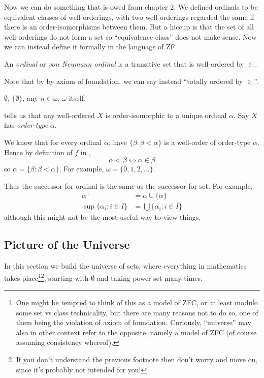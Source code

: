 \documentclass[a4paper]{article}
\begin{document}
Now we can do something that is owed from chapter 2. We defined ordinals to be equivalent classes of well-orderings, with two well-orderings regarded the same if there is an order-isomorphisms between them. But a hiccup is that the set of all well-orderings do not form a set so ``equivalence class'' does not make sense. Now we can instead define it formally in the language of ZF.

\begin{definition}
  An \emph{ordinal} or \emph{von Neumann ordinal} is a transitive set that is well-ordered by \(\in\).
\end{definition}

Note that by by axiom of foundation, we can say instead ``totally ordered by \(\in\)''.

\begin{eg}
  \(\emptyset\), \(\{\emptyset\}\), any \(n \in \omega\), \(\omega\) itself.
\end{eg}

 tells us that any well-ordered \(X\) is order-isomorphic to a unique ordinal \(\alpha\). Say \(X\) has \emph{order-type} \(\alpha\).

\begin{remark}
  We know that for every ordinal \(\alpha\), have \(\{\beta: \beta < \alpha\}\) is a well-order of order-type \(\alpha\). Hence by definition of \(f\) in ,
  \[
    \alpha < \beta \iff \alpha \in \beta
  \]
  so \(\alpha = \{\beta: \beta < \alpha\}\),
  For example, \(\omega = \{0, 1, 2, \dots\}\).

  Thus the successor for ordinal is the same as the successor for set. For example,
  \begin{align*}
    \alpha^+ &= \alpha \cup \{\alpha\} \\
    \sup \{\alpha_i: i \in I\} &= \bigcup \{\alpha_i: i \in I\}
  \end{align*}
  although this might not be the most useful way to view things.
\end{remark}

\subsection{Picture of the Universe}

In this section we build the universe of sets, where everything in mathematics takes place\footnote{One might be tempted to think of this as a model of ZFC, or at least modulo some set vs class technicality, but there are many reasons not to do so, one of them being the violation of axiom of foundation. Curiously, ``universe'' may also in other context refer to the opposite, namely a model of ZFC (of course assuming consistency whereof).}\footnote{If you don't understand the previous footnote then don't worry and move on, since it's probably not intended for you!}, starting with \(\emptyset\) and taking power set many times.
\end{document}

